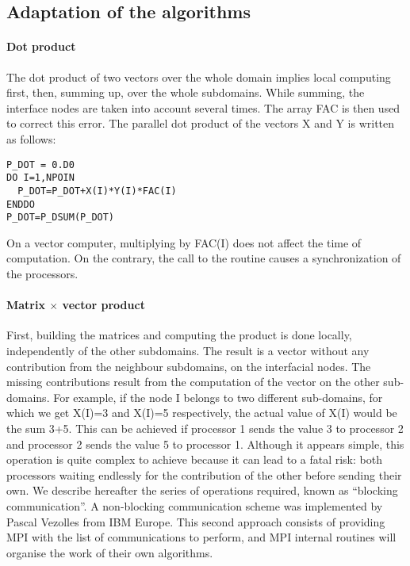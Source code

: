 \subsection{Adaptation of the algorithms}

\paragraph{Dot product}

The dot product of two vectors over the whole domain implies local computing
first, then, summing up, over the whole subdomains. While summing, the interface
nodes are taken into account several times. The array FAC is then used to
correct this error. The parallel dot product  of the vectors X
and Y is written as follows:

\begin{lstlisting}[language=TelFortran]
P_DOT = 0.D0
DO I=1,NPOIN
  P_DOT=P_DOT+X(I)*Y(I)*FAC(I)
ENDDO
P_DOT=P_DSUM(P_DOT)
\end{lstlisting}

On a vector computer, multiplying by FAC(I) does not affect the time of
computation. On the contrary, the call to the  routine causes a
synchronization of the processors.

\paragraph{Matrix $\times$ vector product}

First, building the matrices and computing the product is done locally,
independently of the other subdomains. The result is a vector without any
contribution from the neighbour subdomains, on the interfacial nodes. The
missing contributions result from the computation of the vector on the other
sub-domains. For example, if the node I belongs to two different sub-domains,
for which we get X(I)=3 and X(I)=5 respectively, the actual value of X(I) would
be the sum 3+5. This can be achieved if processor 1 sends the value 3 to
processor 2 and processor 2 sends the value 5 to processor 1. Although it
appears simple, this operation is quite complex to achieve because it can lead
to a fatal risk: both processors waiting endlessly for the contribution of the
other before sending their own. We describe hereafter the series of operations
required, known as ``blocking communication''. A non-blocking
communication scheme was implemented by Pascal Vezolles from IBM Europe.
This second approach consists of providing MPI with the list of
communications to perform, and MPI internal routines will organise the work
of their own algorithms.

